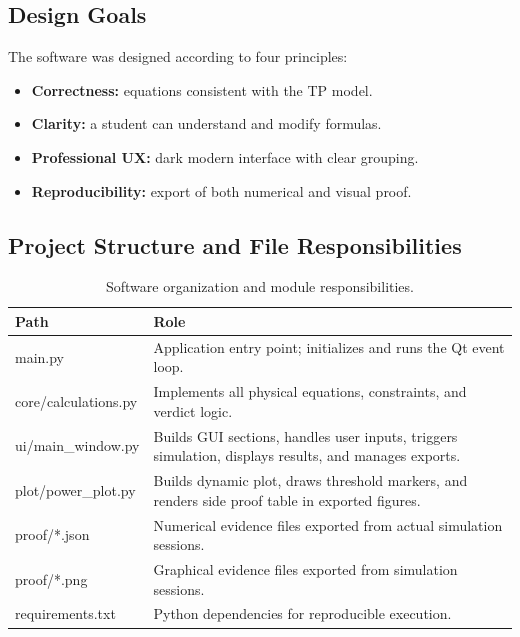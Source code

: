 \documentclass[11pt,a4paper]{article}
\begin{document}
\subsection{Design Goals}
The software was designed according to four principles:
\begin{itemize}[leftmargin=1.2cm]
  \item \textbf{Correctness:} equations consistent with the TP model.
  \item \textbf{Clarity:} a student can understand and modify formulas.
  \item \textbf{Professional UX:} dark modern interface with clear grouping.
  \item \textbf{Reproducibility:} export of both numerical and visual proof.
\end{itemize}

\subsection{Project Structure and File Responsibilities}
\begin{table}[H]
\centering
\begin{tabularx}{\textwidth}{>{\ttfamily}p{}X}
\toprule
\textbf{Path} & \textbf{Role} \\
\midrule
main.py & Application entry point; initializes and runs the Qt event loop. \\
core/calculations.py & Implements all physical equations, constraints, and verdict logic. \\
ui/main\_window.py & Builds GUI sections, handles user inputs, triggers simulation, displays results, and manages exports. \\
plot/power\_plot.py & Builds dynamic plot, draws threshold markers, and renders side proof table in exported figures. \\
proof/*.json & Numerical evidence files exported from actual simulation sessions. \\
proof/*.png & Graphical evidence files exported from simulation sessions. \\
requirements.txt & Python dependencies for reproducible execution. \\
\bottomrule
\end{tabularx}
\caption{Software organization and module responsibilities.}
\end{table}
\end{document}

